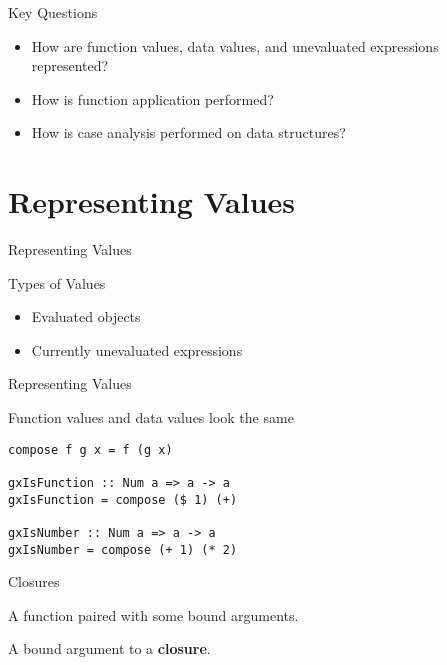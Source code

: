 \documentclass{beamer}
\begin{document}
\begin{frame}{Key Questions}
  \begin{itemize}
  \item<1-> How are function values, data values, and unevaluated
    expressions represented?
  \item<2-> How is function application performed?
  \item<3-> How is case analysis performed on data structures?
  \end{itemize}
\end{frame}

\section{Representing Values}

\begin{frame}{Representing Values}
  \begin{block}{Types of Values}
    \begin{itemize}
    \item Evaluated objects
    \item Currently unevaluated expressions
    \end{itemize}
  \end{block}
\end{frame}

\begin{frame}[fragile]{Representing Values}
  \begin{block}{Function values and data values look the same}
    \begin{verbatim}
compose f g x = f (g x)

gxIsFunction :: Num a => a -> a
gxIsFunction = compose ($ 1) (+)

gxIsNumber :: Num a => a -> a
gxIsNumber = compose (+ 1) (* 2)
    \end{verbatim}
  \end{block}
\end{frame}

\begin{frame}{Closures}
  \begin{definition}[Closure]
    A function paired with some bound arguments.
  \end{definition}

  \begin{definition}
    A bound argument to a \textbf{closure}.
  \end{definition}
\end{frame}
\end{document}
